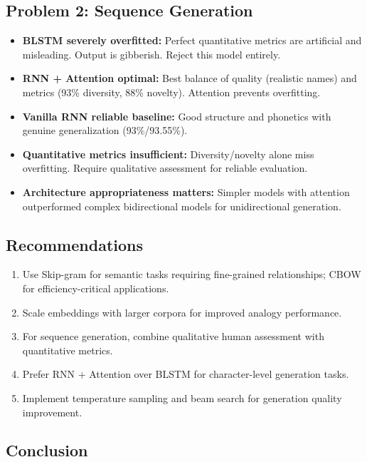\documentclass[12pt,a4paper]{article}
\begin{document}
\subsection{Problem 2: Sequence Generation}

\begin{itemize}
    \item \textbf{BLSTM severely overfitted:} Perfect quantitative metrics are artificial and misleading. Output is gibberish. Reject this model entirely.
    
    \item \textbf{RNN + Attention optimal:} Best balance of quality (realistic names) and metrics (93\% diversity, 88\% novelty). Attention prevents overfitting.
    
    \item \textbf{Vanilla RNN reliable baseline:} Good structure and phonetics with genuine generalization (93\%/93.55\%).
    
    \item \textbf{Quantitative metrics insufficient:} Diversity/novelty alone miss overfitting. Require qualitative assessment for reliable evaluation.
    
    \item \textbf{Architecture appropriateness matters:} Simpler models with attention outperformed complex bidirectional models for unidirectional generation.
\end{itemize}

\subsection{Recommendations}

\begin{enumerate}
    \item Use Skip-gram for semantic tasks requiring fine-grained relationships; CBOW for efficiency-critical applications.
    \item Scale embeddings with larger corpora for improved analogy performance.
    \item For sequence generation, combine qualitative human assessment with quantitative metrics.
    \item Prefer RNN + Attention over BLSTM for character-level generation tasks.
    \item Implement temperature sampling and beam search for generation quality improvement.
\end{enumerate}

\subsection{Conclusion}
\end{document}
